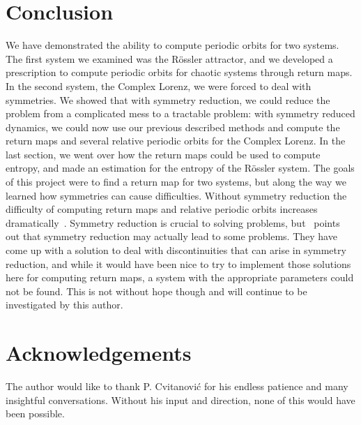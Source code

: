 \documentclass[12 pt]{article}
\begin{document}
\section{Conclusion}
We have demonstrated the ability to compute periodic orbits for two
systems.  The first system we examined was the R\"ossler attractor, and
we developed a prescription to compute periodic orbits for chaotic
systems through return maps.  In the second system, the Complex Lorenz,
we were forced to deal with symmetries.  We showed that with symmetry
reduction, we could reduce the problem from a complicated mess to a
tractable problem: with symmetry reduced dynamics, we could now use our
previous described methods and compute the return maps and several
relative periodic orbits for the Complex Lorenz.  In the last section, we
went over how the return maps could be used to compute entropy, and made
an estimation for the entropy of the R\"ossler system.  The goals of this
project were to find a return map for two systems, but along the way we
learned how symmetries can cause difficulties.  Without symmetry
reduction the difficulty of computing return maps and relative periodic
orbits increases dramatically~\cite{Eth}.  Symmetry reduction is crucial
to solving problems, but~\cite{Atl} points out that symmetry reduction
may actually lead to some problems.  They have come up with a solution to
deal with discontinuities that can arise in symmetry reduction, and while
it would have been nice to try to implement those solutions here for
computing return maps, a system with the appropriate parameters could not
be found.  This is not without hope though and will continue to be
investigated by this author.

\section{Acknowledgements}
The author would like to thank P. Cvitanovi\'c for his endless patience
and many insightful conversations.  Without his input and direction, none
of this would have been possible.
\end{document}
